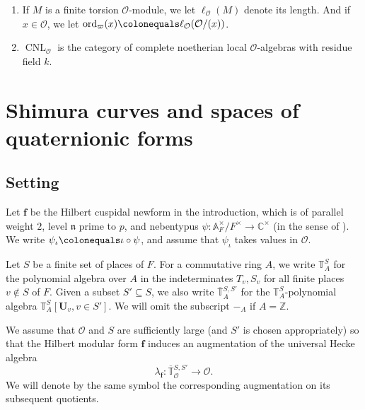 \documentclass[a4paper, notitlepage, 10pt]{amsart}
\theoremstyle{plain} %
\theoremstyle{definition} %
\theoremstyle{remark} %
\numberwithin{equation}{section}
\newcommand{\bbT}{\mathbb T}
\newcommand{\bbZ}{\mathbb Z}
\newcommand{\CNL}{\operatorname{CNL}}
\newcommand{\ord}{\operatorname{ord}} %
\begin{document}
\begin{enumerate}
\item If $M$ is a finite torsion $\mathcal{O}$-module, we let $\ell_{\mathcal{O}}(M)$ denote its length. And if $x\in \mathcal{O}$, we let $\ord_{\varpi}(x)\colonequals\ell_{\mathcal{O}}(\mathcal{O}/(x))$.
\item $\CNL_\mathcal{O}$ is the category of complete noetherian local $\mathcal{O}$-algebras with residue field $k$. 
\end{enumerate}
 
\section{Shimura curves and spaces of quaternionic forms}\label{Section2}
\subsection{Setting}\label{setting}
Let $\mathbf{f}$ be the Hilbert cuspidal newform in the introduction, which is of parallel weight $2$, level $\mathfrak{n}$ prime to $p$, and nebentypus $\psi\colon \mathbb{A}_F^\times/F^\times \to \mathbb{C}^\times$ (in the sense of \cite[\S 12.3]{Nek06}).  We write $\psi_{\iota}\colonequals \iota\circ \psi$, and assume that $\psi_{\iota}$ takes values in $\mathcal{O}$.


Let $S$ be a finite set of places of $F$. For a commutative ring $A$, we write $\mathbb{T}^{S}_A$ for the polynomial algebra over $A$ in the indeterminates $T_v, S_v$ for all finite places $v\not\in S$ of $F$. Given a subset $S'\subseteq S$, we also write $\overline{\bbT}{}^{S,S'}_A$ for the $\bbT^{S}_A$-polynomial algebra $\mathbb{T}^{S}_{A}\left[\mathbf{U}_v,v\in S'\right]$. 
We will omit the subscript $-_A$ if $A=\bbZ$. 

We assume that $\mathcal{O}$ and $S$ are sufficiently large (and $S'$ is chosen appropriately) so that the Hilbert modular form $\mathbf{f}$ induces an augmentation of the universal Hecke algebra
$$ \lambda_{\mathbf{f}}\colon\overline{\mathbb{T}}{}^{S,S'}_{\mathcal{O}} \longrightarrow \mathcal{O}. $$
We will denote by the same symbol the corresponding augmentation on its subsequent quotients.
\end{document}
